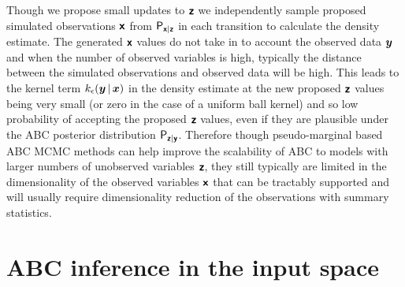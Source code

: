 Though we propose small updates to $\boldsymbol{\mathsf{z}}$ we independently sample proposed simulated observations $\boldsymbol{\mathsf{x}}$ from $\mathsf{P}_{\boldsymbol{\mathsf{x}}|\boldsymbol{\mathsf{z}}}$ in each transition to calculate the density estimate. The generated $\boldsymbol{\mathsf{x}}$ values do not take in to account the observed data $\boldsymbol{y}$ and when the number of observed variables is high, typically the distance between the simulated observations and observed data will be high. This leads to the kernel term $k_\epsilon(\boldsymbol{y}\operatorname{|}\boldsymbol{x})$ in the density estimate at the new proposed $\boldsymbol{\mathsf{z}}$ values being very small (or zero in the case of a uniform ball kernel) and so low probability of accepting the proposed $\boldsymbol{\mathsf{z}}$ values, even if they are plausible under the \ac{ABC} posterior distribution $\mathsf{P}_{\boldsymbol{\mathsf{z}}|\boldsymbol{\mathsf{y}}}$. Therefore though pseudo-marginal based \ac{ABC} \ac{MCMC} methods can help improve the scalability of \ac{ABC} to models with larger numbers of unobserved variables $\boldsymbol{\mathsf{z}}$, they still typically are limited in the dimensionality of the observed variables $\boldsymbol{\mathsf{x}}$ that can be tractably supported and will usually require dimensionality reduction of the observations with summary statistics. 

\section{ABC inference in the input space}\label{sec:abc-inference-in-input-space}


